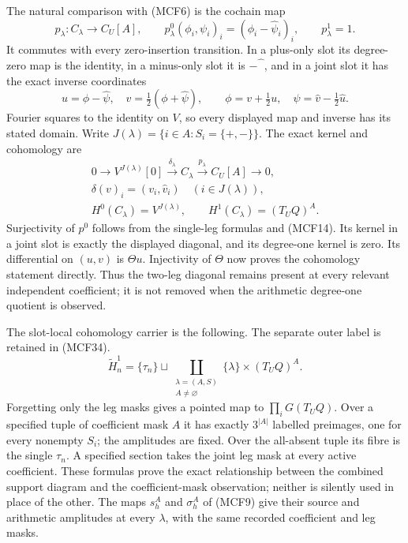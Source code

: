 \documentclass[11pt,a4paper]{article}
\begin{document}
The natural comparison with (MCF6) is the cochain map
\[
p_\lambda:C_\lambda\longrightarrow C_U[A],\qquad
p_\lambda^0(\phi_i,\psi_i)_i
       =(\phi_i-\widehat\psi_i)_i,\qquad
p_\lambda^1=1.
\tag{MCF13}
\]
It commutes with every zero-insertion transition.  In a plus-only slot
its degree-zero map is the identity, in a minus-only slot it is
$-\widehat{\phantom\phi}$, and in a joint slot it has the exact inverse
coordinates
\[
u=\phi-\widehat\psi,\quad v=\tfrac12(\phi+\widehat\psi),\qquad
\phi=v+\tfrac12u,\quad\psi=\widehat v-\tfrac12\widehat u.
\tag{MCF14}
\]
Fourier squares to the identity on $V$, so every displayed map and
inverse has its stated domain.  Write
$J(\lambda)=\{i\in A:S_i=\{+,-\}\}$.  The exact kernel and cohomology are
\[
\begin{gathered}
0\longrightarrow V^{J(\lambda)}[0]
\xrightarrow{\delta_\lambda} C_\lambda
\xrightarrow{p_\lambda} C_U[A]\longrightarrow0,\\
\delta(v)_i=(v_i,\widehat v_i)\quad(i\in J(\lambda)),\\
H^0(C_\lambda)=V^{J(\lambda)},\qquad
H^1(C_\lambda)=(T_UQ)^A.
\end{gathered}
\tag{MCF15}
\]
Surjectivity of $p^0$ follows from the single-leg formulas and (MCF14).
Its kernel in a joint slot is exactly the displayed diagonal, and its
degree-one kernel is zero.  Its differential on $(u,v)$ is $\Theta u$.
Injectivity of $\Theta$ now proves the cohomology statement directly.
Thus the two-leg diagonal remains present at every relevant independent
coefficient; it is not removed when the arithmetic degree-one quotient
is observed.

The slot-local cohomology carrier is the following.  The separate outer
label is retained in (MCF34).
\[
\widetilde H_n^1
=\{\tau_n\}\sqcup
 \coprod_{\substack{\lambda=(A,S)\\ A\ne\varnothing}}
               \{\lambda\}\times(T_UQ)^A.
\tag{MCF16}
\]
Forgetting only the leg masks gives a pointed map to $\prod_iG(T_UQ)$.
Over a specified tuple of coefficient mask $A$ it has exactly
$3^{|A|}$ labelled preimages, one for every nonempty $S_i$; the amplitudes
are fixed.  Over the all-absent tuple its fibre is the single $\tau_n$.
A specified section takes the joint leg mask at every active coefficient.
These formulas prove the exact relationship between the combined support
diagram and the coefficient-mask observation; neither is silently used
in place of the other.  The maps $s_h^A$ and $\sigma_h^A$ of (MCF9)
give their source and arithmetic amplitudes at every $\lambda$, with the
same recorded coefficient and leg masks.
\end{document}
